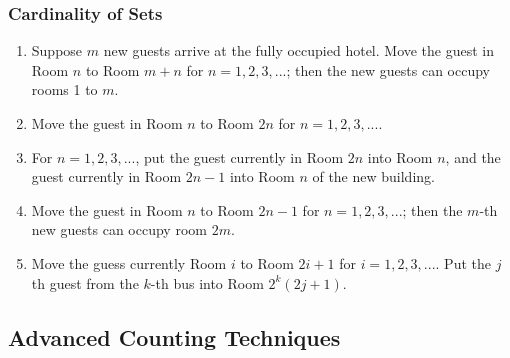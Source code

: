 \documentclass{sig-alternate-05-2015}
\begin{document}
\subsubsection{Cardinality of Sets}
\begin{enumerate}
\item Suppose $m$
new guests arrive at the fully occupied hotel. Move the guest
in Room $n$ to Room $m + n$ for $n = 1, 2, 3, ...$; then the new
guests can occupy rooms 1 to $m$.
\item Move the guest
in Room $n$ to Room $2n$ for $n = 1, 2, 3, ...$.
\item For $n = 1, 2, 3, ...$, put the guest currently in Room $2n$ into Room $n$, and the guest
currently in Room $2n - 1$ into Room $n$ of the new building.
\item Move the guest
in Room $n$ to Room $2n - 1$ for $n = 1, 2, 3, ...$; then the $m$-th new guests can occupy room $2m$.
\item Move the guess currently Room $i$ to Room $2i + 1$ for $i = 1, 2, 3, ...$. Put the $j$ th guest from the $k$-th bus into
Room $2^k(2j + 1)$.
\end{enumerate}

\subsection{Advanced Counting Techniques}
\end{document}
